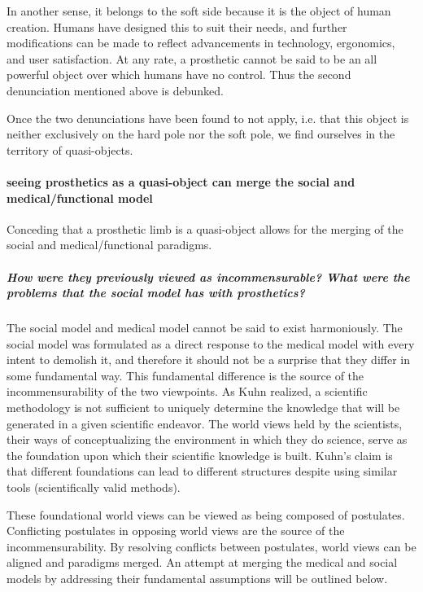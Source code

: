 \documentclass[a4paper]{article}
\begin{document}
In another sense, it belongs to the soft side because it is the object of
human creation. Humans have designed this to suit their needs, and further
modifications can be made to reflect advancements in technology, ergonomics,
and user satisfaction. At any rate, a prosthetic cannot be said to be an all
powerful object over which humans have no control. Thus the second
denunciation mentioned above is debunked.

Once the two denunciations have been found to not apply, i.e. that this object
is neither exclusively on the hard pole nor the soft pole,  we find ourselves
in the territory of quasi-objects.


\paragraph{seeing prosthetics as a quasi-object can merge the social and
medical/functional model}

Conceding that a prosthetic limb is a quasi-object allows for the merging of
the social and medical/functional paradigms.




\subparagraph{How were they previously viewed as incommensurable? What were
the problems that the social model has with prosthetics?}

The social model and medical model cannot be said to exist harmoniously. The
social model was formulated as a direct response to the medical model with
every intent to demolish it, and therefore it should not be a surprise that
they differ in some fundamental way. This fundamental difference is the source
of the incommensurability of the two viewpoints. As Kuhn realized, a
scientific methodology is not sufficient to uniquely determine the knowledge
that will be generated in a given scientific endeavor. The world views held by
the scientists, their ways of conceptualizing the environment in which they do
science, serve as the foundation upon which their scientific knowledge is
built. Kuhn's claim is that different foundations can lead to different
structures despite using similar tools (scientifically valid methods).

These foundational world views can be viewed as being composed of postulates.
Conflicting postulates in opposing world views are the source of the
incommensurability. By resolving conflicts between postulates, world views can
be aligned and paradigms merged. An attempt at merging the medical and social
models by addressing their fundamental assumptions will be outlined below.
\end{document}
